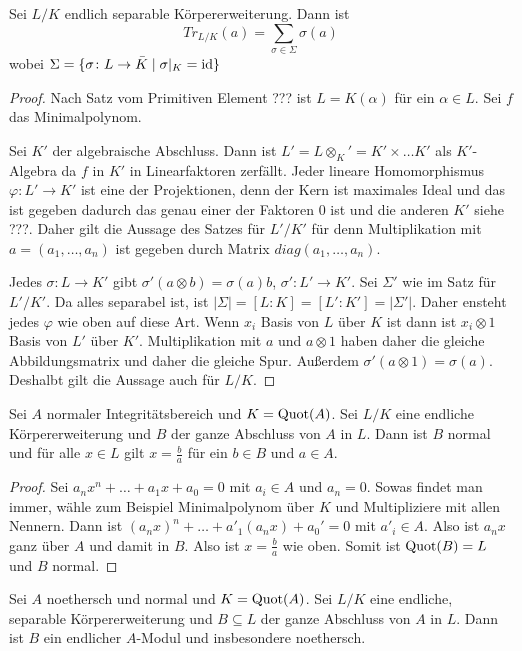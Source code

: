 \begin{Lemma}
	Sei \(L/K\) endlich separable Körpererweiterung. Dann ist \[Tr_{L/K}(a)=\sum_{\sigma\in\Sigma}\sigma(a)\]
	wobei \(\Sigma=\{\sigma\colon L\to \bar{K}\mid \sigma|_K=\mathrm{id}\}\)
\end{Lemma}
\begin{proof}
	Nach Satz vom Primitiven Element ??? ist \(L=K(\alpha)\) für ein \(\alpha\in L\). Sei \(f\) das Minimalpolynom.
	
	Sei \(K'\) der algebraische Abschluss. Dann ist \(L'=L\otimes_K'= K'\times\dots K'\) als \(K'\)-Algebra da \(f\) in \(K'\) in Linearfaktoren zerfällt.
	Jeder lineare Homomorphismus \(\varphi\colon L'\to K'\) ist eine der Projektionen, denn der Kern ist maximales Ideal
	und das ist gegeben dadurch das genau einer der Faktoren 0 ist und die anderen \(K'\) siehe ???.
	Daher gilt die Aussage des Satzes für \(L'/K'\) für denn Multiplikation mit \(a=(a_1,\dots,a_n)\) ist gegeben durch 
	Matrix \(diag(a_1,\dots,a_n)\).
	
	Jedes \(\sigma\colon L\to K'\) gibt \(\sigma'(a\otimes b)=\sigma(a)b\), \(\sigma'\colon L'\to K'\). Sei 
	\(\Sigma'\) wie im Satz für \(L'/K'\).
	Da alles separabel ist, ist \(|\Sigma|=[L:K]=[L':K']=|\Sigma'|\). Daher ensteht jedes \(\varphi\) wie oben auf diese Art.
	Wenn \(x_i\) Basis von \(L\) über \(K\) ist dann ist \(x_i\otimes 1\) Basis von \(L'\) über \(K'\).
	Multiplikation mit \(a\) und \(a\otimes 1\) haben daher die gleiche Abbildungsmatrix und daher die gleiche Spur.
	Außerdem \(\sigma'(a\otimes 1)=\sigma(a)\). Deshalbt gilt die Aussage auch für \(L/K\).
\end{proof}
\begin{Lemma}
	Sei \(A\) normaler Integritätsbereich und \(K=\operatorname{Quot}(A)\). Sei \(L/K\) eine endliche Körpererweiterung 
	und \(B\) der ganze Abschluss von \(A\) in \(L\).
	Dann ist \(B\) normal und für alle \(x\in L\) gilt \(x=\frac b a\) für ein \(b\in B\) und 
	\(a\in A\).
\end{Lemma}
\begin{proof}
	Sei \(a_nx^n+\dots+a_1x+a_0=0\) mit \(a_i\in A\) und \(a_n=0\). Sowas findet man immer,
	wähle zum Beispiel Minimalpolynom über \(K\) und Multipliziere mit allen Nennern.
	Dann ist \((a_nx)^n+\dots+a'_1(a_nx)+a_0'=0\) mit \(a'_i\in A\).
	Also ist \(a_nx\) ganz über \(A\) und damit in \(B\).
	Also ist \(x=\frac b a\) wie oben.
	Somit ist \(\operatorname{Quot}(B)=L\) und \(B\) normal.
\end{proof}
\begin{Satz}
	Sei \(A\) noethersch und normal und \(K=\operatorname{Quot}(A)\). Sei \(L/K\) eine endliche, separable Körpererweiterung
	und \(B\subseteq L\) der ganze Abschluss von \(A\) in \(L\).
	Dann ist \(B\) ein endlicher \(A\)-Modul und insbesondere noethersch.
\end{Satz}
